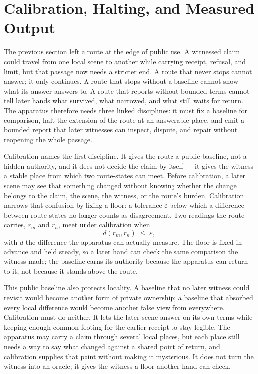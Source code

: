 \section{Calibration, Halting, and Measured Output}

The previous section left a route at the edge of public use. A witnessed claim could travel from one local scene to another while carrying receipt, refusal, and limit, but that passage now needs a stricter end. A route that never stops cannot answer; it only continues. A route that stops without a baseline cannot show what its answer answers to. A route that reports without bounded terms cannot tell later hands what survived, what narrowed, and what still waits for return. The apparatus therefore needs three linked disciplines: it must fix a baseline for comparison, halt the extension of the route at an answerable place, and emit a bounded report that later witnesses can inspect, dispute, and repair without reopening the whole passage.

Calibration names the first discipline. It gives the route a public baseline, not a hidden authority, and it does not decide the claim by itself --- it gives the witness a stable place from which two route-states can meet. Before calibration, a later scene may see that something changed without knowing whether the change belongs to the claim, the scene, the witness, or the route's burden. Calibration narrows that confusion by fixing a floor: a tolerance $\varepsilon$ below which a difference between route-states no longer counts as disagreement. Two readings the route carries, $r_m$ and $r_n$, meet under calibration when
\[ d(r_m, r_n) \;\le\; \varepsilon, \]
with $d$ the difference the apparatus can actually measure. The floor is fixed in advance and held steady, so a later hand can check the same comparison the witness made; the baseline earns its authority because the apparatus can return to it, not because it stands above the route.

This public baseline also protects locality. A baseline that no later witness could revisit would become another form of private ownership; a baseline that absorbed every local difference would become another false view from everywhere. Calibration must do neither. It lets the later scene answer on its own terms while keeping enough common footing for the earlier receipt to stay legible. The apparatus may carry a claim through several local places, but each place still needs a way to say what changed against a shared point of return, and calibration supplies that point without making it mysterious. It does not turn the witness into an oracle; it gives the witness a floor another hand can check.

